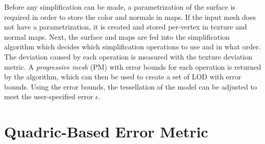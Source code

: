 Before any simplification can be made, a parametrization of the surface is required in order to store the color and normals in maps. If the input mesh does not have a parametrization, it is created and stored per-vertex in texture and normal maps. Next, the surface and maps are fed into the simplification algorithm which decides which simplification operations to use and in what order. The deviation caused by each operation is measured with the texture deviation metric. A \emph{progressive mesh} (PM) with error bounds for each operation is returned by the algorithm, which can then be used to create a set of LOD with error bounds. Using the error bounds, the tessellation of the model can be adjusted to meet the user-specified error $\epsilon$.

\section{Quadric-Based Error Metric} \label{sec:quadric-based_error_metric}
\iffalse %
